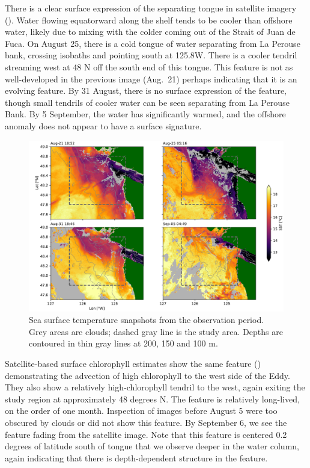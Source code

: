 \documentclass[draft]{agujournal2019}
\newcommand*{\Eddy}{{\sc Eddy}}
\begin{document}
There is a clear surface expression of the separating tongue in satellite imagery ().  Water flowing equatorward along the shelf tends to be cooler than offshore water, likely due to mixing with the colder coming out of the Strait of Juan de Fuca. On August 25, there is a cold tongue of water separating from La Perouse bank, crossing isobaths and pointing south at 125.8\textdegree W.   There is a cooler tendril streaming west at 48 N off the south end of this tongue.  This feature is not as well-developed in the previous image (Aug.\ 21) perhaps indicating that it is an evolving feature.  By 31 August, there is no surface expression of the feature, though small tendrils of cooler water can be seen separating from La Perouse Bank.  By 5 September, the water has significantly warmed, and the offshore anomaly does not appear to have a surface signature.

\begin{figure}
  \begin{center}
    \includegraphics[width=6in]{SSTSnaps}
    \caption{Sea surface temperature snapshots from the observation period.  Grey areas are clouds; dashed gray line is the study area. Depths are contoured in thin gray lines at 200, 150 and 100 m. \cite{L2PMetopA}\label{fig:SST}}
  \end{center}
\end{figure}

Satellite-based surface chlorophyll estimates show the same feature () demonstrating the advection of high chlorophyll to the west side of the \Eddy. They also show a relatively high-chlorophyll tendril to the west, again exiting the study region at approximately 48 degrees N.  The feature is relatively long-lived, on the order of one month.  Inspection of images before August 5 were too obscured by clouds or did not show this feature.  By September 6, we see the feature fading from the satellite image.  Note that this feature is centered 0.2 degrees of latitude south of tongue that we observe deeper in the water column, again indicating that there is depth-dependent structure in the feature.
\end{document}
